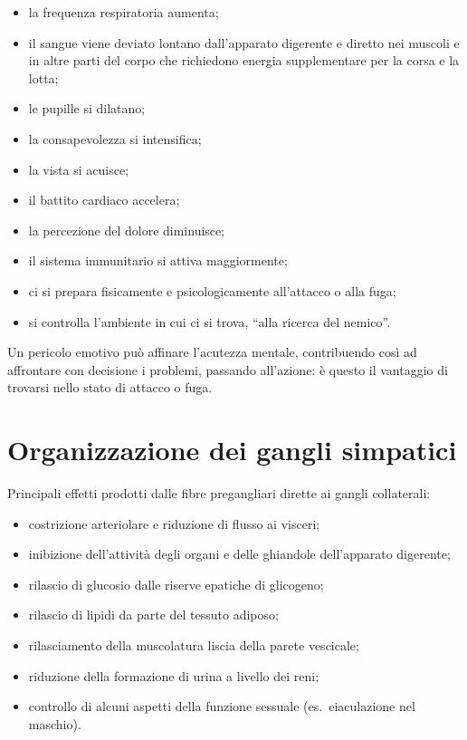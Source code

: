 \begin{itemize}
  \item la frequenza respiratoria aumenta;
  \item il sangue viene deviato lontano dall'apparato digerente e diretto
    nei muscoli e in altre parti del corpo che richiedono energia
    supplementare per la corsa e la lotta;
  \item le pupille si dilatano;
  \item la consapevolezza si intensifica;
  \item la vista si acuisce;
  \item il battito cardiaco accelera;
  \item la percezione del dolore diminuisce;
  \item il sistema immunitario si attiva maggiormente;
  \item ci si prepara fisicamente e psicologicamente all'attacco o alla
    fuga;
  \item si controlla l'ambiente in cui ci si trova, ``alla ricerca del
    nemico''.
\end{itemize}

Un pericolo emotivo può affinare l'acutezza mentale, contribuendo così ad
affrontare con decisione i problemi, passando all'azione: è questo il
vantaggio di trovarsi nello stato di attacco o fuga.

\section{Organizzazione dei gangli simpatici}

Principali effetti prodotti dalle fibre pregangliari dirette ai gangli
collaterali:
\begin{itemize}
  \item costrizione arteriolare e riduzione di flusso ai visceri;
  \item inibizione dell'attività degli organi e delle ghiandole
    dell'apparato digerente;
  \item rilascio di glucosio dalle riserve epatiche di glicogeno;
  \item rilascio di lipidi da parte del tessuto adiposo;
  \item rilasciamento della muscolatura liscia della parete vescicale;
  \item riduzione della formazione di urina a livello dei reni;
  \item controllo di alcuni aspetti della funzione sessuale (es.\
    eiaculazione nel maschio).
\end{itemize}

